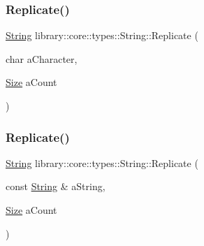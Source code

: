 \subsubsection{\texorpdfstring{Replicate()}{Replicate()}\hspace{0.1cm}{\footnotesize\ttfamily [1/2]}}
{\footnotesize\ttfamily \hyperlink{classlibrary_1_1core_1_1types_1_1_string}{String} library\+::core\+::types\+::\+String\+::\+Replicate (\begin{DoxyParamCaption}\item[{char}]{a\+Character,  }\item[{\hyperlink{namespacelibrary_1_1core_1_1types_a701626ea1027888ebbb8cfd0ff7adab0}{Size}}]{a\+Count }\end{DoxyParamCaption})\hspace{0.3cm}{\ttfamily [static]}}

\mbox{\label{classlibrary_1_1core_1_1types_1_1_string_a85504c430c0fdc58393f819205fedd49}} 
\subsubsection{\texorpdfstring{Replicate()}{Replicate()}\hspace{0.1cm}{\footnotesize\ttfamily [2/2]}}
{\footnotesize\ttfamily \hyperlink{classlibrary_1_1core_1_1types_1_1_string}{String} library\+::core\+::types\+::\+String\+::\+Replicate (\begin{DoxyParamCaption}\item[{const \hyperlink{classlibrary_1_1core_1_1types_1_1_string}{String} \&}]{a\+String,  }\item[{\hyperlink{namespacelibrary_1_1core_1_1types_a701626ea1027888ebbb8cfd0ff7adab0}{Size}}]{a\+Count }\end{DoxyParamCaption})\hspace{0.3cm}{\ttfamily [static]}}

\mbox{\label{classlibrary_1_1core_1_1types_1_1_string_a42426ffb11bb0b2789ba0991064a01b5}} 
